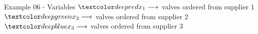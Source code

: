 \begin{frame}{Example 06 - Variables}
\LARGE{
$\colora{{x}_{1}} \longrightarrow$
    valves ordered from supplier 1  \\ \vspace{1cm}
$\colorb{{x}_{2}} \longrightarrow$
    valves ordered from supplier 2 \\ \vspace{1cm}
$\colorc{{x}_{3}} \longrightarrow$
    valves ordered from supplier 3
}
\end{frame}
